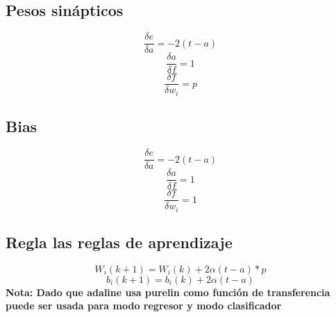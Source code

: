 \documentclass{article}
\begin{document}
\subsection{Pesos sinápticos}
$$ \frac{\delta e}{\delta a} = -2(t-a)$$
$$ \frac{\delta a}{\delta f} = 1$$
$$ \frac{\delta f}{\delta w_i} = p$$ 
\subsection{Bias}
$$ \frac{\delta e}{\delta a} = -2(t-a)$$
$$ \frac{\delta a}{\delta f} = 1$$
$$ \frac{\delta f}{\delta w_i} = 1$$
\subsection{Regla las reglas de aprendizaje}
$$ W_i(k+1) = W_i(k) + 2\alpha(t-a)*p $$
$$ b_i(k+1) = b_i(k) + 2\alpha(t-a) $$
\textbf{Nota: Dado que adaline usa purelin como función de transferencia puede ser usada para modo regresor y modo clasificador} 
\end{document}
